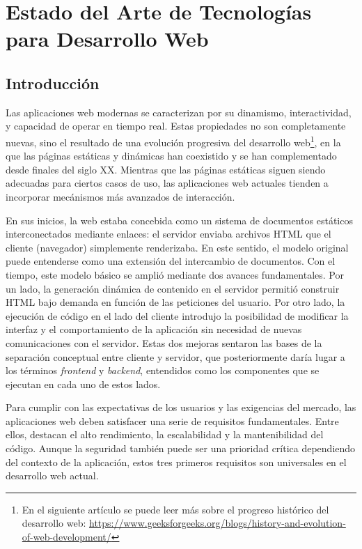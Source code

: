 \chapter{Estado del Arte de Tecnologías para Desarrollo Web}
\label{cap:estadoDelArteDeTecnologias}


\section{Introducción}

Las aplicaciones web modernas se caracterizan por su dinamismo, interactividad, y capacidad de operar en tiempo real. Estas propiedades no son completamente nuevas, sino el resultado de una evolución progresiva del desarrollo web\footnote{En el siguiente artículo se puede leer más sobre el progreso histórico del desarrollo web: \url{https://www.geeksforgeeks.org/blogs/history-and-evolution-of-web-development/}}, en la que las páginas estáticas y dinámicas han coexistido y se han complementado desde finales del siglo XX. Mientras que las páginas estáticas siguen siendo adecuadas para ciertos casos de uso, las aplicaciones web actuales tienden a incorporar mecánismos más avanzados de interacción. 

En sus inicios, la web estaba concebida como un sistema de documentos estáticos interconectados mediante enlaces: el servidor enviaba archivos HTML que el cliente (navegador) simplemente renderizaba. En este sentido, el modelo original puede entenderse como una extensión del intercambio de documentos. Con el tiempo, este modelo básico se amplió mediante dos avances fundamentales. Por un lado, la generación dinámica de contenido en el servidor permitió construir HTML bajo demanda en función de las peticiones del usuario. Por otro lado, la ejecución de código en el lado del cliente introdujo la posibilidad de modificar la interfaz y el comportamiento de la aplicación sin necesidad de nuevas comunicaciones con el servidor. Estas dos mejoras sentaron las bases de la separación conceptual entre cliente y servidor, que posteriormente daría lugar a los términos \textit{frontend} y \textit{backend}, entendidos como los componentes que se ejecutan en cada uno de estos lados.

Para cumplir con las expectativas de los usuarios y las exigencias del mercado, las aplicaciones web deben satisfacer una serie de requisitos fundamentales. Entre ellos, destacan el alto rendimiento, la escalabilidad y la mantenibilidad del código. Aunque la seguridad también puede ser una prioridad crítica dependiendo del contexto de la aplicación, estos tres primeros requisitos son universales en el desarrollo web actual.

